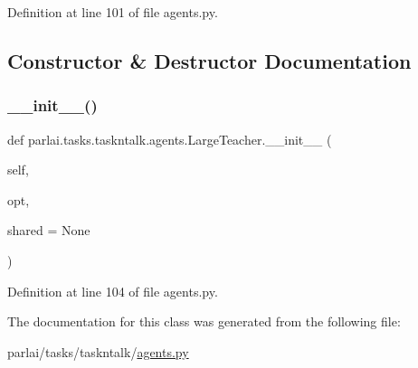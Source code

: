 Definition at line 101 of file agents.\+py.



\subsection{Constructor \& Destructor Documentation}
\mbox{\label{classparlai_1_1tasks_1_1taskntalk_1_1agents_1_1LargeTeacher_af178f2514d254ac1ae9b0d956041d13c}} 
\subsubsection{\texorpdfstring{\+\_\+\+\_\+init\+\_\+\+\_\+()}{\_\_init\_\_()}}
{\footnotesize\ttfamily def parlai.\+tasks.\+taskntalk.\+agents.\+Large\+Teacher.\+\_\+\+\_\+init\+\_\+\+\_\+ (\begin{DoxyParamCaption}\item[{}]{self,  }\item[{}]{opt,  }\item[{}]{shared = {\ttfamily None} }\end{DoxyParamCaption})}



Definition at line 104 of file agents.\+py.



The documentation for this class was generated from the following file\+:\begin{DoxyCompactItemize}
\item 
parlai/tasks/taskntalk/\hyperlink{parlai_2tasks_2taskntalk_2agents_8py}{agents.\+py}\end{DoxyCompactItemize}
